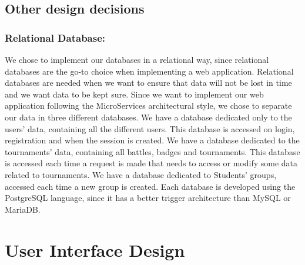 \documentclass{article}
\begin{document}
{\subsection{Other design decisions}
    \subsubsection{Relational Database:} We chose to implement our databases in a relational way, since relational databases are the go-to choice when 
    implementing a web application. Relational databases are needed when we want to ensure that data will not be lost in time and we want data to be kept sure.
    Since we want to implement our web application following the MicroServices architectural style, we chose to separate our data in three different databases.
    We have a database dedicated only to the users' data, containing all the different users. This database is accessed on login, registration and when the 
    session is created.
    We have a database dedicated to the tournaments' data, containing all battles, badges and tournaments. This database is accessed each time a request 
    is made that needs to access or modify some data related to tournaments.
    We have a database dedicated to Students' groups, accessed each time a new group is created.
    Each database is developed using the PostgreSQL language, since it has a better trigger architecture than MySQL or MariaDB.
\section{User Interface Design}
}
\end{document}
